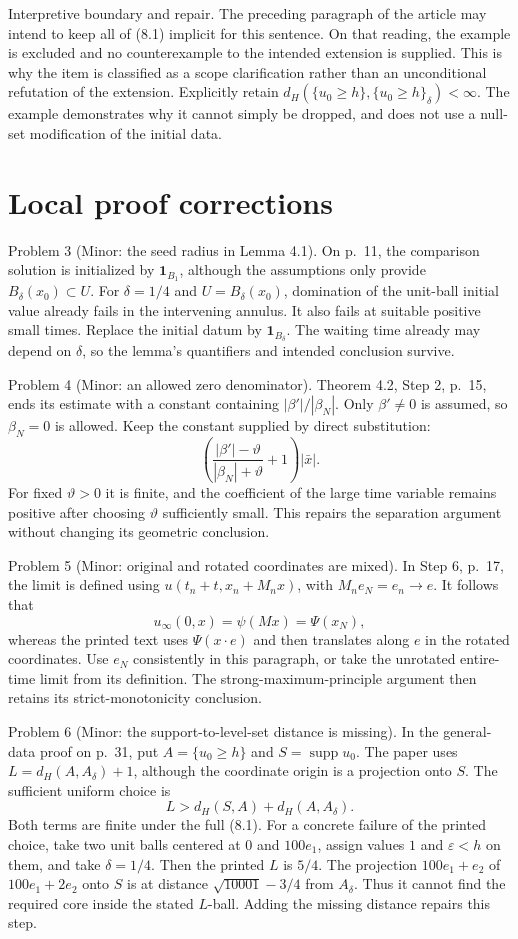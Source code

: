 \documentclass[10pt]{article}
\begin{document}
Interpretive boundary and repair. The preceding paragraph of the article may intend to keep all of (8.1) implicit for this sentence. On that reading, the example is excluded and no counterexample to the intended extension is supplied. This is why the item is classified as a scope clarification rather than an unconditional refutation of the extension. Explicitly retain \(d_H(\{u_0\ge h\},\{u_0\ge h\}_\delta)<\infty\). The example demonstrates why it cannot simply be dropped, and does not use a null-set modification of the initial data.\par
\section*{Local proof corrections}
Problem 3 (Minor: the seed radius in Lemma 4.1).  On p. 11, the comparison solution is initialized by \(\mathbf1_{B_1}\), although the assumptions only provide \(B_\delta(x_0)\subset U\). For \(\delta=1/4\) and \(U=B_\delta(x_0)\), domination of the unit-ball initial value already fails in the intervening annulus. It also fails at suitable positive small times. Replace the initial datum by \(\mathbf1_{B_\delta}\). The waiting time already may depend on \(\delta\), so the lemma’s quantifiers and intended conclusion survive.\par
Problem 4 (Minor: an allowed zero denominator).  Theorem 4.2, Step 2, p. 15, ends its estimate with a constant containing \(|\beta'|/|\beta_N|\). Only \(\beta'\ne0\) is assumed, so \(\beta_N=0\) is allowed. Keep the constant supplied by direct substitution: \[\left(\frac{|\beta'|-\vartheta}{|\beta_N|+\vartheta}
                   +1\right)|\bar x|.\] For fixed \(\vartheta>0\) it is finite, and the coefficient of the large time variable remains positive after choosing \(\vartheta\) sufficiently small. This repairs the separation argument without changing its geometric conclusion.\par
Problem 5 (Minor: original and rotated coordinates are mixed).  In Step 6, p. 17, the limit is defined using \(u(t_n+t,x_n+M_nx)\), with \(M_ne_N=e_n\to e\). It follows that \[u_\infty(0,x)=\psi(Mx)=\Psi(x_N),\] whereas the printed text uses \(\Psi(x\cdot e)\) and then translates along \(e\) in the rotated coordinates. Use \(e_N\) consistently in this paragraph, or take the unrotated entire-time limit from its definition. The strong-maximum-principle argument then retains its strict-monotonicity conclusion.\par
Problem 6 (Minor: the support-to-level-set distance is missing).  In the general-data proof on p. 31, put \(A=\{u_0\ge h\}\) and \(S=\operatorname{supp}u_0\). The paper uses \(L=d_H(A,A_\delta)+1\), although the coordinate origin is a projection onto \(S\). The sufficient uniform choice is \[L>d_H(S,A)+d_H(A,A_\delta).\] Both terms are finite under the full (8.1). For a concrete failure of the printed choice, take two unit balls centered at \(0\) and \(100e_1\), assign values \(1\) and \(\varepsilon<h\) on them, and take \(\delta=1/4\). Then the printed \(L\) is \(5/4\). The projection \(100e_1+e_2\) of \(100e_1+2e_2\) onto \(S\) is at distance \(\sqrt{10001}-3/4\) from \(A_\delta\). Thus it cannot find the required core inside the stated \(L\)-ball. Adding the missing distance repairs this step.\par
\end{document}
